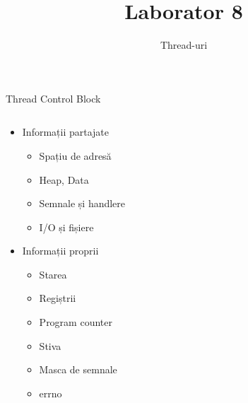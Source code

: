 \documentclass{so.cs.pub.ro}
\title[Laborator 8]{Laborator 8}
\subtitle{Thread-uri}
\begin{document}
\frame{\titlepage}


\begin{frame}{Thread Control Block}
\begin{columns}

\begin{column}[1]{0.38\textwidth}
	\begin{itemize}
		\item Informații partajate
   	\begin{itemize}
    		\item Spațiu de adresă
   		\item Heap, Data
   		\item Semnale și handlere
   		\item I/O și fișiere
  	 	\end{itemize}
   	\item Informații proprii
   	\begin{itemize}
   		\item Starea
   		\item Regiștrii
   		\item Program counter
   		\item Stiva
   		\item Masca de semnale
   		\item errno
   	\end{itemize}
	\end{itemize}
\end{column}
\begin{column}[1]{0.52\textwidth}
\end{column}
\end{columns}
\end{frame}
\end{document}
